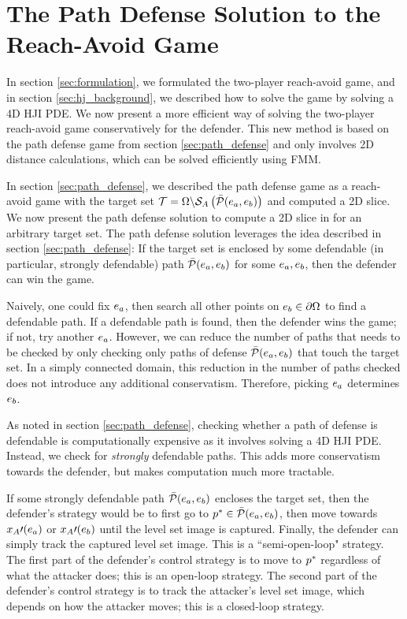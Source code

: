 \section{The Path Defense Solution to the Reach-Avoid Game}
\label{sec:reach_avoid}
In section \ref{sec:formulation}, we formulated the two-player reach-avoid game, and in section \ref{sec:hj_background}, we described how to solve the game by solving a 4D HJI PDE. We now present a more efficient way of solving the two-player reach-avoid game conservatively for the defender. This new method is based on the path defense game from section \ref{sec:path_defense} and only involves 2D distance calculations, which can be solved efficiently using FMM.

In section \ref{sec:path_defense}, we described the path defense game as a reach-avoid game with the target set $\mathcal{T}=\Omega\backslash\mathcal{S}_A\left(\bar{\mathcal{P}}(e_a,e_b)\right)$ and computed a 2D slice. We now present the path defense solution to compute a 2D slice in for an arbitrary target set. The path defense solution leverages the idea described in section \ref{sec:path_defense}: If the target set is enclosed by some defendable (in particular, strongly defendable) path $\bar{\mathcal{P}}(e_a,e_b)$ for some $e_a,e_b$, then the defender can win the game. 

Naively, one could fix $e_a$, then search all other points on $e_b\in\partial\Omega$ to find a defendable path. If a defendable path is found, then the defender wins the game; if not, try another $e_a$. However, we can reduce the number of paths that needs to be checked by only checking only paths of defense $\bar{\mathcal{P}}(e_a,e_b)$ that touch the target set. In a simply connected domain, this reduction in the number of paths checked does not introduce any additional conservatism. Therefore, picking $e_a$ determines $e_b$. 

As noted in section \ref{sec:path_defense}, checking whether a path of defense is defendable is computationally expensive as it involves solving a 4D HJI PDE. Instead, we check for \textit{strongly} defendable paths. This adds more conservatism towards the defender, but makes computation much more tractable.

If some strongly defendable path $\bar{\mathcal{P}}(e_a,e_b)$ encloses the target set, then the defender's strategy would be to first go to $p^*\in\bar{\mathcal{P}}(e_a,e_b)$, then move towards $x_A\prime(e_a)$ or $x_A\prime(e_b)$ until the level set image is captured. Finally, the defender can simply track the captured level set image. This is a ``semi-open-loop" strategy. The first part of the defender's control strategy is to move to $p^*$ regardless of what the attacker does; this is an open-loop strategy. The second part of the defender's control strategy is to track the attacker's level set image, which depends on how the attacker moves; this is a closed-loop strategy.

